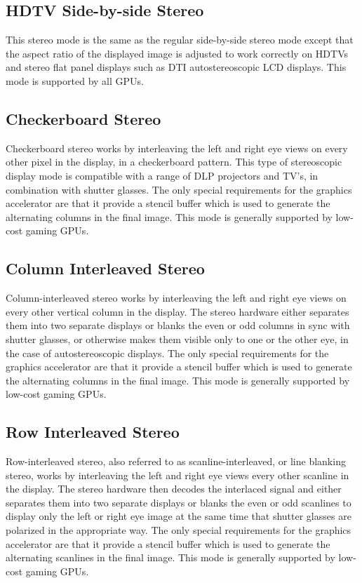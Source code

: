 \subsection{HDTV Side-by-side Stereo}
This stereo mode is the same as the regular side-by-side stereo mode
except that the aspect ratio of the displayed image is adjusted to work
correctly on HDTVs and stereo flat panel displays such as 
DTI autostereoscopic LCD displays.  This mode is supported by all GPUs.

\subsection{Checkerboard Stereo}
Checkerboard stereo works by interleaving the left and right eye 
views on every other pixel in the display, in a checkerboard pattern.
This type of stereoscopic display mode is compatible with a range of
DLP projectors and TV's, in combination with shutter glasses.
The only special requirements for the graphics accelerator are that 
it provide a stencil buffer which is used to generate the 
alternating columns in the final image.
This mode is generally supported by low-cost gaming GPUs.

\subsection{Column Interleaved Stereo}
Column-interleaved stereo works by interleaving the left and right eye 
views on every other vertical column in the display.  
The stereo hardware either separates them into two separate displays or blanks
the even or odd columns in sync with shutter glasses, or otherwise makes
them visible only to one or the other eye, in the case of autostereoscopic
displays.
The only special requirements for the graphics accelerator are that 
it provide a stencil buffer which is used to generate the 
alternating columns in the final image.
This mode is generally supported by low-cost gaming GPUs.

\subsection{Row Interleaved Stereo}
Row-interleaved stereo, also referred to as scanline-interleaved, or
line blanking stereo,
works by interleaving the left and right eye views every other scanline
in the display.  The stereo hardware then decodes the interlaced
signal and either separates them into two separate displays or blanks
the even or odd scanlines to display only the left or right eye image
at the same time that shutter glasses are polarized in the appropriate
way.  The only special requirements for the graphics accelerator 
are that it provide a stencil buffer which is used to generate 
the alternating scanlines in the final image.
This mode is generally supported by low-cost gaming GPUs.

